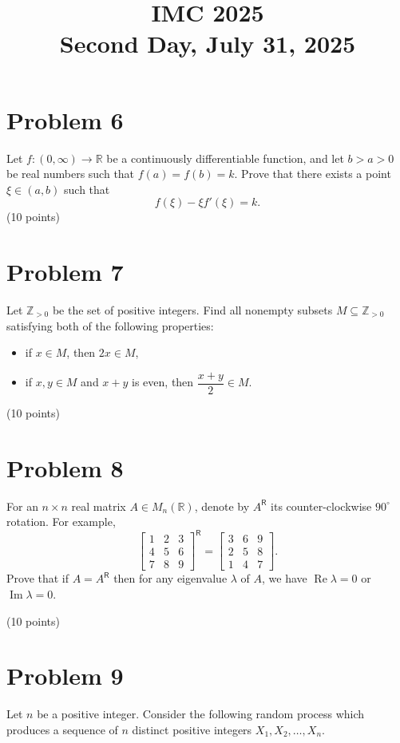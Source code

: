 \documentclass{article}
\title{IMC 2025 \\ Second Day, July 31, 2025}
\date{}
\begin{document}
\maketitle

\section*{Problem 6}
Let $f : (0, \infty) \to \mathbb{R}$ be a continuously differentiable function, and let $b > a > 0$ be real numbers such that $f(a) = f(b) = k$. Prove that there exists a point $\xi \in (a,b)$ such that
\[
f(\xi) - \xi f'(\xi) = k.
\]
(10 points)

\section*{Problem 7}
Let $\mathbb{Z}_{>0}$ be the set of positive integers. Find all nonempty subsets $M \subseteq \mathbb{Z}_{>0}$ satisfying both of the following properties:
\begin{itemize}
\item[(a)] if $x \in M$, then $2x \in M$,
\item[(b)] if $x, y \in M$ and $x + y$ is even, then $\dfrac{x+y}{2} \in M$.
\end{itemize}
(10 points)

\section*{Problem 8}
For an $n \times n$ real matrix $A \in M_n(\mathbb{R})$, denote by $A^{\mathsf{R}}$ its counter-clockwise $90^\circ$ rotation. For example,
\[
\begin{bmatrix} 1 & 2 & 3 \\ 4 & 5 & 6 \\ 7 & 8 & 9 \end{bmatrix}^{\mathsf{R}} = \begin{bmatrix} 3 & 6 & 9 \\ 2 & 5 & 8 \\ 1 & 4 & 7 \end{bmatrix}.
\]
Prove that if $A = A^{\mathsf{R}}$ then for any eigenvalue $\lambda$ of $A$, we have $\operatorname{Re}\lambda = 0$ or $\operatorname{Im}\lambda = 0$.

(10 points)

\section*{Problem 9}
Let $n$ be a positive integer. Consider the following random process which produces a sequence of $n$ distinct positive integers $X_1, X_2, \ldots, X_n$.
\end{document}
